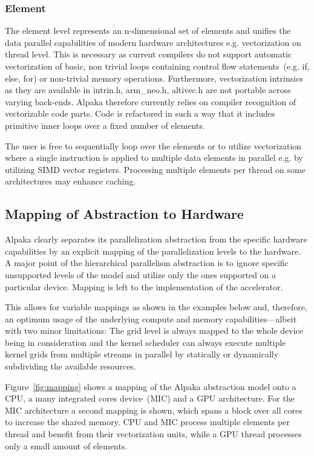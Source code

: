 \documentclass[10pt, twocolumn]{article}
\newcommand{\alpaka}{Alpaka\xspace}
\begin{document}
\subsubsection{\textbf{Element}}
The element level represents an n-dimensional set of elements and unifies the data parallel capabilities of modern hardware architectures e.g. vectorization on thread level.
This is necessary as current compilers do not support automatic vectorization of basic, non trivial loops containing control flow statements~(e.g. if, else, for) or non-trivial memory operations.
Furthermore, vectorization intrinsics as they are available in intrin.h, arm\_neo.h, altivec.h are not portable across varying back-ends.
\alpaka therefore currently relies on compiler recognition of vectorizable code parts. Code is refactored in such a way that it includes primitive inner loops over a fixed number of elements.

The user is free to sequentially loop over the elements or to utilize vectorization where a single instruction is applied to multiple data elements in parallel e.g. by utilizing SIMD vector registers.
Processing multiple elements per thread on some architectures may enhance caching.

\subsection{Mapping of Abstraction to Hardware}
\label{subsec:mapping}
\alpaka clearly separates its parallelization abstraction from the specific hardware capabilities by an explicit mapping of the parallelization levels to the hardware.
A major point of the hierarchical parallelism abstraction is to ignore specific unsupported levels of the model and utilize only the ones supported on a particular device. Mapping is left to the implementation of the accelerator.

This allows for variable mappings as shown in the examples below and, therefore, an optimum usage of the underlying compute and memory capabilities---albeit with two minor limitations: The grid level is always mapped to the whole device being in consideration and the kernel scheduler can always execute multiple kernel grids from multiple streams in parallel by statically or dynamically subdividing the available resources.

Figure~\ref{fig:mapping} shows a mapping of the \alpaka abstraction model onto a CPU, a many integrated cores device~(MIC) and a GPU architecture.
For the MIC architecture a second mapping is shown, which spans a block over all cores to increase the shared memory.
CPU and MIC process multiple elements per thread and benefit from their vectorization units, while a GPU thread processes only a small amount of elements.
\end{document}
